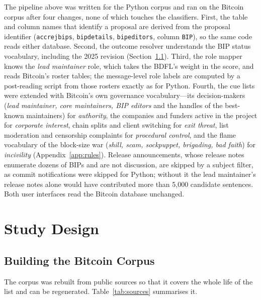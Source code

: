 \documentclass[sigconf,screen]{acmart}
\begin{document}
The pipeline above was written for the Python corpus and ran on the Bitcoin corpus after four changes, none of which touches the classifiers. First, the table and column names that identify a proposal are derived from the proposal identifier (\texttt{accrejbips}, \texttt{bipdetails}, \texttt{bipeditors}, column \texttt{BIP}), so the same code reads either database. Second, the outcome resolver understands the BIP status vocabulary, including the 2025 revision (Section~\ref{sec:corpus}). Third, the role mapper knows the \emph{lead maintainer} role, which takes the BDFL's weight in the score, and reads Bitcoin's roster tables; the message-level role labels are computed by a post-reading script from those rosters exactly as for Python. Fourth, the cue lists were extended with Bitcoin's own governance vocabulary---its decision-makers (\emph{lead maintainer, core maintainers, BIP editors} and the handles of the best-known maintainers) for \emph{authority}, the companies and funders active in the project for \emph{corporate interest}, chain splits and client switching for \emph{exit threat}, list moderation and censorship complaints for \emph{procedural control}, and the flame vocabulary of the block-size war (\emph{shill, scam, sockpuppet, brigading, bad faith}) for \emph{incivility} (Appendix~\ref{app:rules}). Release announcements, whose release notes enumerate dozens of BIPs and are not discussion, are skipped by a subject filter, as commit notifications were skipped for Python; without it the lead maintainer's release notes alone would have contributed more than 5,000 candidate sentences. Both user interfaces read the Bitcoin database unchanged.

\section{Study Design}
\label{sec:design}

\subsection{Building the Bitcoin Corpus}
\label{sec:corpus}

The corpus was rebuilt from public sources so that it covers the whole life of the list and can be regenerated. Table~\ref{tab:sources} summarises it.
\end{document}
